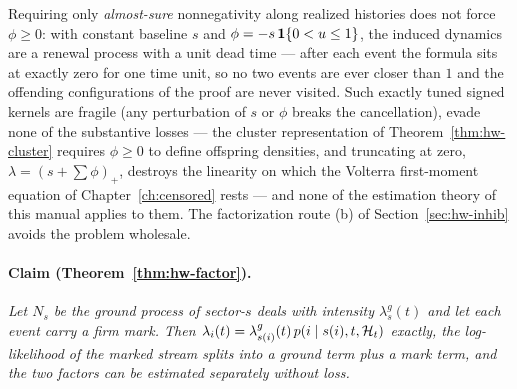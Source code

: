 \begin{remark}
\label{rem:app-signed}
Requiring only \emph{almost-sure} nonnegativity along realized histories does not force $\phi \ge
0$: with constant baseline $s$ and $\phi = -s\,\mathbf{1}\{0 < u \le 1\}$, the induced dynamics are a
renewal process with a unit dead time --- after each event the formula sits at exactly zero for one
time unit, so no two events are ever closer than $1$ and the offending configurations of the proof
are never visited. Such exactly tuned signed kernels are fragile (any perturbation of $s$ or $\phi$
breaks the cancellation), evade none of the substantive losses --- the cluster representation of
Theorem~\ref{thm:hw-cluster} requires $\phi \ge 0$ to define offspring densities, and truncating at
zero, $\lambda = (s + \sum\phi)_+$, destroys the linearity on which the Volterra first-moment
equation of Chapter~\ref{ch:censored} rests --- and none of the estimation theory of this manual
applies to them. The factorization route (b) of Section~\ref{sec:hw-inhib} avoids the problem
wholesale.
\end{remark}

\paragraph{Claim (Theorem~\ref{thm:hw-factor}).}
\emph{Let $N_s$ be the ground process of sector-$s$ deals with intensity $\lambda^g_s(t)$ and let
each event carry a firm mark. Then $\lambda_i(t) = \lambda^g_{s(i)}(t)\, p(i \mid s(i), t, \mathcal{H}_t)$
exactly, the log-likelihood of the marked stream splits into a ground term plus a mark term, and the
two factors can be estimated separately without loss.}

